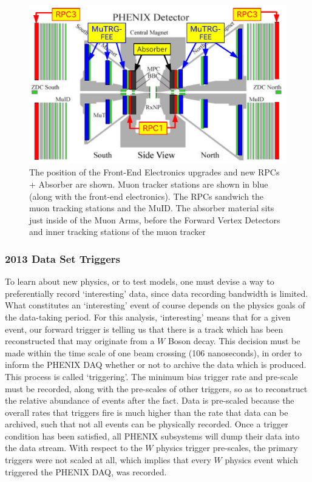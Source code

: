 \begin{figure}[ht]
  \centering
  \includegraphics[width=0.8\linewidth]{./figures/muon_arms_upgrades.png}
  \caption{
    The position of the Front-End Electronics upgrades and new RPCs + Absorber
    are shown. Muon tracker stations are shown in blue (along with the front-end
    electronics). The RPCs sandwich the muon tracking stations and the MuID.
    The absorber material sits just inside of the Muon Arms, before the Forward
    Vertex Detectors and inner tracking stations of the muon
    tracker~\cite{Fukao2011}
  }
  \label{fig:muon_arms_upgrades}

\end{figure}

\subsubsection{2013 Data Set Triggers}

To learn about new physics, or to test models, one must devise a way to
preferentially record `interesting' data, since data recording bandwidth is
limited. What constitutes an `interesting' event of course depends on the
physics goals of the data-taking period. For this analysis, `interesting' means
that for a given event, our forward trigger is telling us that there is a track
which has been reconstructed that may originate from a $W$ Boson decay. This
decision must be made within the time scale of one beam crossing (106
nanoseconds), in order to inform the PHENIX DAQ whether or not to archive the
data which is produced. This process is called `triggering'. The minimum bias
trigger rate and pre-scale must be recorded, along with the pre-scales of other
triggers, so as to reconstruct the relative abundance of events after the fact.
Data is pre-scaled because the overall rates that triggers fire is much higher
than the rate that data can be archived, such that not all events can be
physically recorded. Once a trigger condition has been satisfied, all PHENIX
subsystems will dump their data into the data stream. With respect to the $W$
physics trigger pre-scales, the primary triggers were not scaled at all, which
implies that every $W$ physics event which triggered the PHENIX DAQ, was
recorded.

